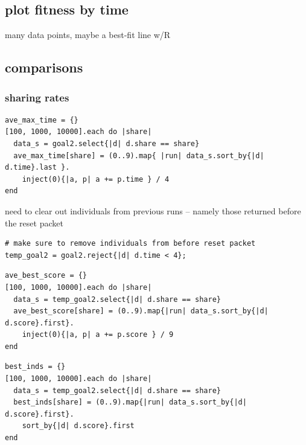\documentclass[11pt]{article}
\begin{document}
\subsection*{plot fitness by time}
\label{sec-2.3}

many data points, maybe a best-fit line w/R
\subsection*{comparisons}
\label{sec-2.4}
\subsubsection*{sharing rates}
\label{sec-2.4.1}


\lstset{language=Ruby}
\begin{lstlisting}
ave_max_time = {}
[100, 1000, 10000].each do |share|
  data_s = goal2.select{|d| d.share == share}
  ave_max_time[share] = (0..9).map{ |run| data_s.sort_by{|d| d.time}.last }.
    inject(0){|a, p| a += p.time } / 4
end
\end{lstlisting}

need to clear out individuals from previous runs -- namely those
returned before the reset packet
\lstset{language=Ruby}
\begin{lstlisting}
# make sure to remove individuals from before reset packet
temp_goal2 = goal2.reject{|d| d.time < 4};
\end{lstlisting}

\lstset{language=Ruby}
\begin{lstlisting}
ave_best_score = {}
[100, 1000, 10000].each do |share|
  data_s = temp_goal2.select{|d| d.share == share}
  ave_best_score[share] = (0..9).map{|run| data_s.sort_by{|d| d.score}.first}.
    inject(0){|a, p| a += p.score } / 9
end
\end{lstlisting}

\lstset{language=Ruby}
\begin{lstlisting}
best_inds = {}
[100, 1000, 10000].each do |share|
  data_s = temp_goal2.select{|d| d.share == share}
  best_inds[share] = (0..9).map{|run| data_s.sort_by{|d| d.score}.first}.
    sort_by{|d| d.score}.first
end
\end{lstlisting}
\end{document}
